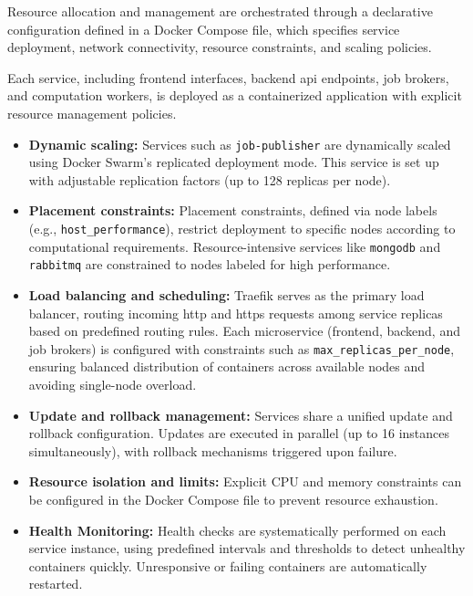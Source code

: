 Resource allocation and management are orchestrated through a declarative configuration defined in a Docker Compose file, which specifies service deployment, network connectivity, resource constraints, and scaling policies.

Each service, including frontend interfaces, backend \acrshort{api} endpoints, job brokers, and computation workers, is deployed as a containerized application with explicit resource management policies.

\begin{itemize}
    \item \textbf{Dynamic scaling:} Services such as \texttt{job-publisher} are dynamically scaled using Docker Swarm's replicated deployment mode. This service is set up with adjustable replication factors (up to 128 replicas per node).
    
    \item \textbf{Placement constraints:} Placement constraints, defined via node labels (e.g., \texttt{host\_performance}), restrict deployment to specific nodes according to computational requirements. Resource-intensive services like \texttt{mongodb} and \texttt{rabbitmq} are constrained to nodes labeled for high performance.
    
    \item \textbf{Load balancing and scheduling:} Traefik serves as the primary load balancer, routing incoming \acrshort{http} and \acrshort{https} requests among service replicas based on predefined routing rules. Each microservice (frontend, backend, and job brokers) is configured with constraints such as \texttt{max\_replicas\_per\_node}, ensuring balanced distribution of containers across available nodes and avoiding single-node overload.
    
    \item \textbf{Update and rollback management:} Services share a unified update and rollback configuration. Updates are executed in parallel (up to 16 instances simultaneously), with rollback mechanisms triggered upon failure.
    
    \item \textbf{Resource isolation and limits:} Explicit CPU and memory constraints can be configured in the Docker Compose file to prevent resource exhaustion.
    
    \item \textbf{Health Monitoring:} Health checks are systematically performed on each service instance, using predefined intervals and thresholds to detect unhealthy containers quickly. Unresponsive or failing containers are automatically restarted.
\end{itemize}

